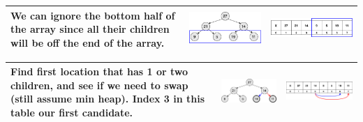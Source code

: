 \begin{center}
	\begin{table}
		\begin{tabular}{| p{}|M{0.30\textwidth}|M{0.35\textwidth}|}
			\hline
			\scriptsize{We can ignore the bottom half of the array since all their children will be off the end of the array.}
			  &   
			\includegraphics[scale=.30]{images/heapify_tree_02.png}
			  &   
			\includegraphics[scale=.30]{images/heapify_02.png}\\
			\hline
		\end{tabular}
	\end{table}
\end{center}

\begin{center}
	\begin{table}
		\begin{tabular}{| p{}|M{0.30\textwidth}|M{0.35\textwidth}|}
			\hline
			\scriptsize{Find first location that has 1 or two children, and see if we need to swap (still assume min heap). Index 3 in this table our first candidate.}
			  &   
			\includegraphics[scale=.30]{images/heapify_tree_03.png}
			  &   
			\includegraphics[scale=.30]{images/heapify_03.png}\\
			\hline
		\end{tabular}
	\end{table}
\end{center}


